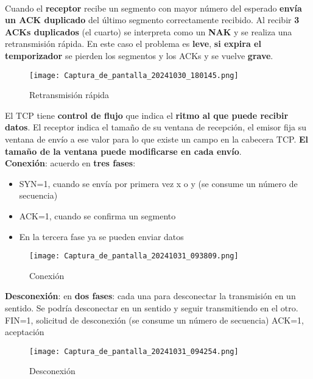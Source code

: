 \documentclass{article}
\begin{document}
\\

Cuando el \textbf{receptor} recibe un segmento con mayor número del esperado \textbf{envía un ACK duplicado} del último segmento correctamente recibido. Al recibir \textbf{3 ACKs duplicados} (el cuarto) se interpreta como un \textbf{NAK} y se realiza una retransmisión rápida. En este caso el problema es \textbf{leve}, \textbf{si expira el temporizador} se pierden los segmentos y los ACKs y se vuelve \textbf{grave}. \\

\begin{figure}[h]
    \centering
    \texttt{[image: Captura\_de\_pantalla\_20241030\_180145.png]} %
    \caption{Retransmisión rápida}
    \label{fig:etiqueta}
\end{figure}

El TCP tiene \textbf{control de flujo} que indica el \textbf{ritmo al que puede recibir datos}. El receptor indica el tamaño de su ventana de recepción, el emisor fija su ventana de envío a ese valor para lo que existe un campo en la cabecera TCP. \textbf{El tamaño de la ventana puede modificarse en cada envío}. \\

\textbf{Conexión}: acuerdo en \textbf{tres fases}:
\begin{itemize}
    \item SYN=1, cuando se envía por primera vez x o y (se consume un número de secuencia)
    \item ACK=1, cuando se confirma un segmento 
    \item En la tercera fase ya se pueden enviar datos
\end{itemize}

\begin{figure}[h]
    \centering
    \texttt{[image: Captura\_de\_pantalla\_20241031\_093809.png]} %
    \caption{Conexión}
    \label{fig:etiqueta}
\end{figure}

\newpage

\textbf{Desconexión}: en \textbf{dos fases}: cada una para desconectar la transmisión en un sentido. Se podría desconectar en un sentido y seguir transmitiendo en el otro. \\
FIN=1, solicitud de desconexión (se consume un número de secuencia)
ACK=1, aceptación

\begin{figure}[h]
    \centering
    \texttt{[image: Captura\_de\_pantalla\_20241031\_094254.png]} %
    \caption{Desconexión}
    \label{fig:etiqueta}
\end{figure}
\end{document}

